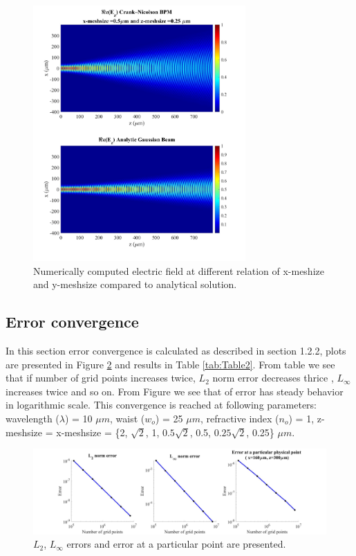 \documentclass{article}
\begin{document}
	\begin{figure}[H]
		\hspace{-24.5mm}
		\includegraphics[width=0.725\textwidth]{change5.jpg}	
		\caption{\label{fig:Relation} Numerically computed electric field at different relation of x-meshize and y-meshsize compared to analytical solution.}
	\end{figure}
	
	\subsection{Error convergence}
	In this section error convergence is calculated as described in section 1.2.2, plots are presented in Figure \ref{fig:Error} and results in Table \ref{tab:Table2}. From table we see that if number of grid points increases twice, $L_{2}$ norm error decreases thrice , $L_{\infty}$ increases twice and so on. From Figure we see that of error has steady behavior in logarithmic scale. This convergence is reached at following parameters: wavelength ($\lambda$) = 10 $\mu m$, waist ($w_o$) = 25 $\mu m$, refractive index ($n_o$) = 1, z-meshsize = x-meshsize  = \{2, $\sqrt{2}$, 1, $0.5\sqrt{2}$, 0.5, $0.25\sqrt{2}$, 0.25\} $\mu m$.
	\begin{figure}[H]
		\hspace{-30mm}
		\includegraphics[width=1.5\textwidth]{error.jpg}
		\caption{\label{fig:Error} $L_{2}$, $L_{\infty}$ errors and error at a particular point are presented.}
	\end{figure}
	
\end{document}
